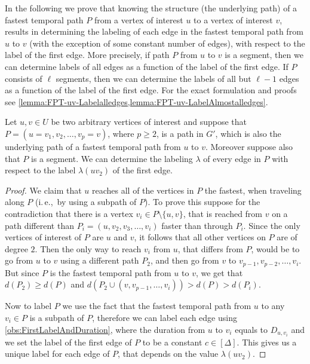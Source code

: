 \documentclass[a4paper,UKenglish,cleveref, autoref, thm-restate]{lipics-v2021}
\newcommand{\ie}{i.\,e.,\ }
\begin{document}
In the following we prove that knowing the structure (the underlying path) of a fastest temporal path $P$ from a vertex of interest $u$ to a vertex of interest $v$,
results in determining the labeling of each edge in the fastest temporal path from $u$ to $v$ 
(with the exception of some constant number of edges), with respect to the label of the first edge.
More precisely, if path $P$ from $u$ to $v$ is a segment, then we can determine labels of all edges as a function of the label of the first edge.
If $P$ consists of $\ell$ segments, then we can determine the labels of all but $\ell -1$ edges as a function of the label of the first edge.
For the exact formulation and proofs see \cref{lemma:FPT-uv-Labelalledges,lemma:FPT-uv-LabelAlmostalledges}.

\begin{lemma}\label{lemma:FPT-uv-Labelalledges}
    Let $u, v \in U$ be two arbitrary vertices of interest and suppose that $P = (u=v_1,v_2, \dots, v_p = v)$, where $p \geq 2$, 
    is a path in $G'$, which is also the underlying path of a fastest temporal path from $u$ to $v$.
    Moreover suppose also that $P$ is a segment.
    We can determine the labeling $\lambda$ of every edge in $P$ with respect to the label $\lambda(uv_2)$ of the first edge.
\end{lemma}

\begin{proof}
We claim that $u$ reaches all of the vertices in $P$ the fastest, when traveling along $P$ (\ie by using a subpath of $P$).
To prove this suppose for the contradiction that there is a vertex $v_i \in P \setminus \{u,v\}$, that is reached from $v$ on a path different than $P_i = (u, v_2, v_3, \dots, v_i)$ faster than through $P_i$.
Since the only vertices of interest of $P$ are $u$ and $v$, it follows that all other vertices on $P$ are of degree $2$. 
Then the only way to reach $v_i$ from $u$, that differs from $P$, would be to go from $u$ to $v$ using a different path $P_2$,
and then go from $v$ to $v_{p-1}, v_{p-2}, \dots, v_i$.
But since $P$ is the fastest temporal path from $u$ to $v$, we get that $d(P_2) \geq d(P)$ and $d(P_2 \cup (v,v_{p-1}, \dots, v_i)) > d(P) > d(P_i)$.

Now to label $P$ we use the fact that the fastest temporal path from $u$ to any $v_i \in P$ is a subpath of $P$, 
therefore we can label each edge using \cref{obs:FirstLabelAndDuration},
where the duration from $u$ to $v_i$ equals to $D_{u,v_i}$ and 
we set the label of the first edge of $P$ to be a constant $c\in [\Delta]$.
This gives us a unique label for each edge of $P$, that depends on the value $\lambda(u v_2)$.
\end{proof}
\end{document}

